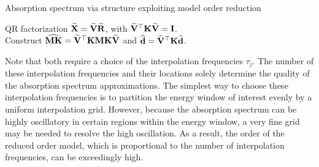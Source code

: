\begin{algorithm2e}[hbtp]
\caption{Absorption spectrum via structure exploiting model order reduction}%
\label{alg:mor-MK}%
\BlankLine

\BlankLine
{}
\BlankLine
\BlankLine
{}
\nl QR factorization $\widetilde{\mathbf{X}} = \widetilde{\mathbf{V}}\widetilde{\mathbf{R}}$, with $\widetilde{\mathbf{V}}^\top \mathbf{K} \widetilde{\mathbf{V}} = \mathbf{I}$.\\
\nl Construct $\widehat{\mathbf{M}\mathbf{K}} = \widetilde{\mathbf{V}}^\top \mathbf{K}\mathbf{M}\mathbf{K} \widetilde{\mathbf{V}}$ and $\widehat{\mathbf{d}} = \widetilde{\mathbf{V}}^\top \mathbf{K} \widetilde{\mathbf{d}}$. \\
\BlankLine
{}
\end{algorithm2e}

Note that both  require a choice of the interpolation frequencies $\tau_j$. The number of these interpolation frequencies and their locations solely determine the quality of the absorption spectrum approximations. The simplest way to choose these interpolation frequencies is to partition the energy window of interest evenly by a uniform interpolation grid. However, because the absorption spectrum can be highly oscillatory in certain regions within the energy window, a very fine grid may be needed to resolve the high oscillation. As a result, the order of the reduced order model, which is proportional to the number of interpolation frequencies, can be exceedingly high.

